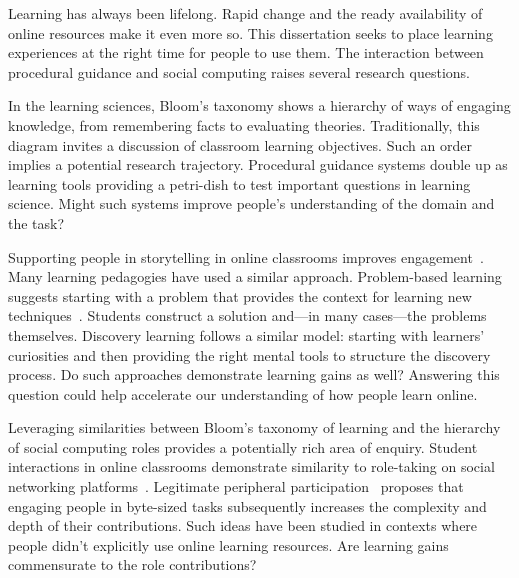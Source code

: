 Learning has always been lifelong. Rapid change and the ready availability of online resources make it even more so. This dissertation seeks to place learning experiences at the right time for people to use them. The interaction between procedural guidance and social computing raises several research questions. 

In the learning sciences, Bloom’s taxonomy shows a hierarchy of ways of engaging knowledge, from remembering facts to evaluating theories. Traditionally, this diagram invites a discussion of classroom learning objectives. Such an order implies a potential research trajectory. Procedural guidance systems double up as learning tools providing a petri-dish to test important questions in learning science. Might such systems improve people's understanding of the domain and the task?

Supporting people in storytelling in online classrooms improves engagement~\cite{Pandey2015}. Many learning pedagogies have used a similar approach. Problem-based learning suggests starting with a problem that provides the context for learning new techniques~\cite{johnson2009breaking}. Students construct a solution and---in many cases---the problems themselves. Discovery learning follows a similar model: starting with learners' curiosities and then providing the right mental tools to structure the discovery process. Do such approaches demonstrate learning gains as well? Answering this question could help accelerate our understanding of how people learn online.

Leveraging similarities between Bloom’s taxonomy of learning and the hierarchy of social computing roles provides a potentially rich area of enquiry. Student interactions in online classrooms demonstrate similarity to role-taking on social networking platforms~\cite{kizilcec2013deconstructing}. Legitimate peripheral participation~\cite{Bryant2005} proposes that engaging people in byte-sized tasks subsequently increases the complexity and depth of their contributions. Such ideas have been studied in contexts where people didn't explicitly use online learning resources. Are learning gains commensurate to the role contributions? 


